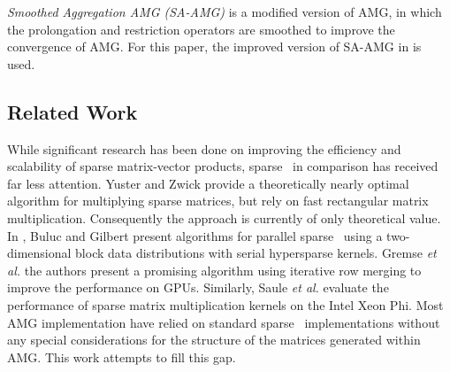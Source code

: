 \textit{Smoothed Aggregation AMG (SA-AMG)}\cite{Vanek:1995} is a modified version of AMG,
in which the prolongation and restriction operators are smoothed %
to improve the convergence of AMG.
For this paper, the improved version of SA-AMG in \cite{treister2015non} is used.


\subsection{Related Work}
\label{sec:related}

While significant research has been done on improving the efficiency and scalability of sparse matrix-vector products, sparse \mm\ in comparison has received far less attention. Yuster and Zwick \cite{Yuster2005} provide a theoretically nearly optimal algorithm for multiplying sparse matrices, but rely on fast rectangular matrix multiplication. Consequently the approach is currently of only theoretical value. In \cite{Buluc12}, Buluc and Gilbert present algorithms for parallel sparse \mm\ using a two-dimensional block data distributions with serial hypersparse kernels. 
Gremse {\em et al.} \cite{Gremse15} the authors present a promising algorithm using iterative row merging to improve the performance on GPUs. Similarly, Saule {\em et al.} \cite{Saule14} evaluate the performance of sparse matrix multiplication kernels on the Intel Xeon Phi. Most AMG implementation have relied on standard sparse \mm\ implementations without any special considerations for the structure of the matrices generated within AMG. This work attempts to fill this gap. 






